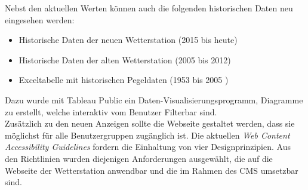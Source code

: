 \documentclass[10pt]{article}
\begin{document}
\begin{multicols}{2}
Nebst den aktuellen Werten können auch die folgenden historischen Daten neu eingesehen werden: 
\begin{itemize}
\item Historische Daten der neuen Wetterstation (2015 bis heute)
\item Historische Daten der alten Wetterstation (2005 bis 2012)
\item Exceltabelle mit historischen Pegeldaten (1953 bis 2005 )
\end{itemize}

Dazu wurde mit Tableau Public ein Daten-Visualisierungsprogramm, Diagramme zu erstellt, welche interaktiv vom Benutzer Filterbar sind.\\ 

Zusätzlich zu den neuen Anzeigen sollte die Webseite gestaltet werden, dass sie möglichst für alle Benutzergruppen zugänglich ist. Die aktuellen \emph{Web Content Accessibility Guidelines} fordern die Einhaltung von vier Designprinzipien. Aus den Richtlinien wurden diejenigen Anforderungen ausgewählt, die auf die Webseite der Wetterstation anwendbar und die im Rahmen des CMS umsetzbar sind. \\



\end{multicols}
\end{document}
